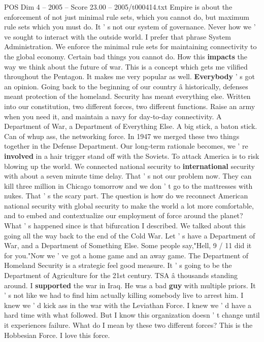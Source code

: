 \begin{textsample}{POS Dim 4 – 2005 – Score 23.00 – 2005/t000414.txt}
Empire is about the enforcement of not just minimal rule sets, which you cannot do, but maximum rule sets which you must do.
It ' s not our system of governance.
Never how we ' ve sought to interact with the outside world.
I prefer that phrase System Administration.
We enforce the minimal rule sets for maintaining connectivity to the global economy.
Certain bad things you cannot do.
How this \textbf{impacts} the way we think about the future of war.
This is a concept which gets me vilified throughout the Pentagon.
It makes me very popular as well. \textbf{Everybody} ' s got an opinion.
Going back to the beginning of our country â historically, defenses meant protection of the homeland.
Security has meant everything else.
Written into our constitution, two different forces, two different functions.
Raise an army when you need it, and maintain a navy for day-to-day connectivity.
A Department of War, a Department of Everything Else.
A big stick, a baton stick.
Can of whup ass, the networking force.
In 1947 we merged these two things together in the Defense Department.
Our long-term rationale becomes, we ' re \textbf{involved} in a hair trigger stand off with the Soviets.
To attack America is to risk blowing up the world.
We connected national security to \textbf{international} security with about a seven minute time delay.
That ' s not our problem now.
They can kill three million in Chicago tomorrow and we don ' t go to the mattresses with nukes.
That ' s the scary part.
The question is how do we reconnect American national security with global security to make the world a lot more comfortable, and to embed and contextualize our employment of force around the planet?
What ' s happened since is that bifurcation I described.
We talked about this going all the way back to the end of the Cold War.
Let ' s have a Department of War, and a Department of Something Else.
Some people say,"Hell, 9 / 11 did it for you."Now we ' ve got a home game and an away game.
The Department of Homeland Security is a strategic feel good measure.
It ' s going to be the Department of Agriculture for the 21st century.
TSA â thousands standing around.
I \textbf{supported} the war in Iraq.
He was a bad \textbf{guy} with multiple priors.
It ' s not like we had to find him actually killing somebody live to arrest him.
I knew we ' d kick ass in the war with the Leviathan Force.
I knew we ' d have a hard time with what followed.
But I know this organization doesn ' t change until it experiences failure.
What do I mean by these two different forces?
This is the Hobbesian Force.
I love this force.

\end{textsample}
